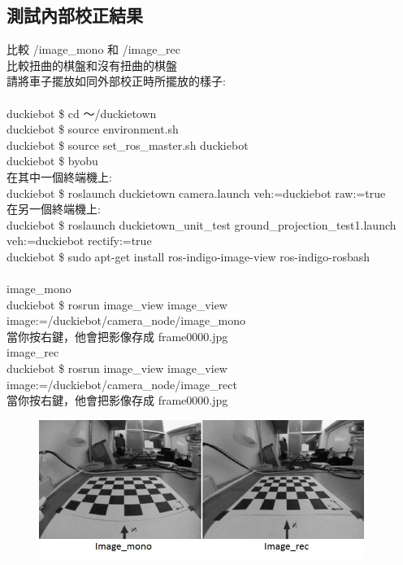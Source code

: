 \documentclass{article}
\begin{document}
\subsection{測試內部校正結果}

比較 /image\_mono 和 /image\_rec
\\比較扭曲的棋盤和沒有扭曲的棋盤
\\請將車子擺放如同外部校正時所擺放的樣子:
\\
\\duckiebot \$ cd ～/duckietown
\\duckiebot \$ source environment.sh
\\duckiebot \$ source set\_ros\_master.sh duckiebot
\\duckiebot \$ byobu
\\在其中一個終端機上:
\\duckiebot \$ roslaunch duckietown camera.launch veh:=duckiebot raw:=true
\\在另一個終端機上:
\\duckiebot \$ roslaunch duckietown\_unit\_test ground\_projection\_test1.launch veh:=duckiebot  rectify:=true
\\duckiebot \$ sudo apt-get install ros-indigo-image-view ros-indigo-rosbash
\\
\\image\_mono
\\duckiebot \$ rosrun image\_view image\_view image:=/duckiebot/camera\_node/image\_mono
\\當你按右鍵，他會把影像存成 frame0000.jpg
\\image\_rec
\\duckiebot \$ rosrun image\_view image\_view image:=/duckiebot/camera\_node/image\_rect
\\當你按右鍵，他會把影像存成 frame0000.jpg
\begin{figure}[htp]
    \begin{center}
        \includegraphics[width=300pt]{pic/圖片20.jpg}
    \end{center}
\end{figure}
\end{document}
